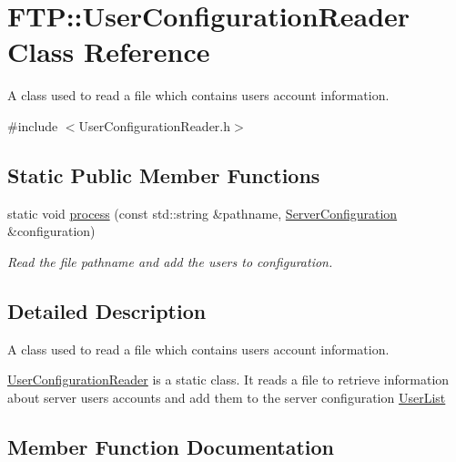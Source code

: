 \hypertarget{classFTP_1_1UserConfigurationReader}{}\section{F\+T\+P\+:\+:User\+Configuration\+Reader Class Reference}
\label{classFTP_1_1UserConfigurationReader}


A class used to read a file which contains user\textquotesingle{}s account information.  




{\ttfamily \#include $<$User\+Configuration\+Reader.\+h$>$}

\subsection*{Static Public Member Functions}
\begin{DoxyCompactItemize}
\item 
static void \hyperlink{classFTP_1_1UserConfigurationReader_a2e522080a3cc4b378e82b75fc3ceb529}{process} (const std\+::string \&pathname, \hyperlink{classFTP_1_1ServerConfiguration}{Server\+Configuration} \&configuration)
\begin{DoxyCompactList}\small\item\em Read the file pathname and add the users to configuration. \end{DoxyCompactList}\end{DoxyCompactItemize}


\subsection{Detailed Description}
A class used to read a file which contains user\textquotesingle{}s account information. 

\hyperlink{classFTP_1_1UserConfigurationReader}{User\+Configuration\+Reader} is a static class. It reads a file to retrieve information about server users accounts and add them to the server configuration \hyperlink{classFTP_1_1UserList}{User\+List} 

\subsection{Member Function Documentation}
\hypertarget{classFTP_1_1UserConfigurationReader_a2e522080a3cc4b378e82b75fc3ceb529}{}
